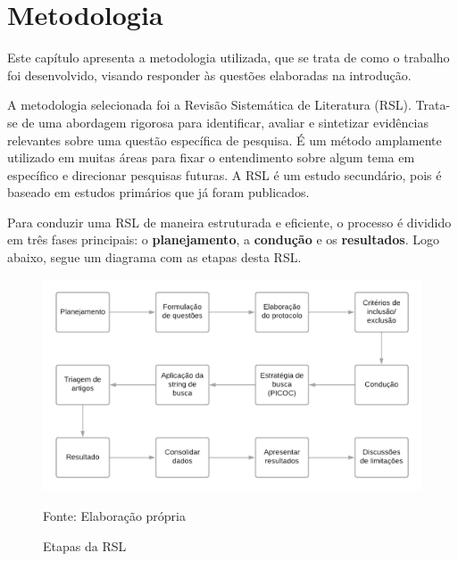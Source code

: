 \chapter[Metodologia]{Metodologia}

Este capítulo apresenta a metodologia utilizada, que se trata de como o trabalho foi desenvolvido, visando responder às questões elaboradas na introdução.

A metodologia selecionada foi a Revisão Sistemática de Literatura (RSL). Trata-se de uma abordagem rigorosa para identificar, avaliar e sintetizar evidências relevantes sobre uma questão específica de pesquisa. É um método amplamente utilizado em muitas áreas para fixar o entendimento sobre algum tema em específico e direcionar pesquisas futuras. A RSL é um estudo secundário, pois é baseado em estudos primários que já foram publicados.

Para conduzir uma RSL de maneira estruturada e eficiente, o processo é dividido em três fases principais: o \textbf{planejamento}, a \textbf{condução} e os \textbf{resultados}. Logo abaixo, segue um diagrama com as etapas desta RSL.

\begin{figure}[h]
	\centering %
	\includegraphics[width=16cm]{figuras/diagrama-RSL.png} %
	\caption{Etapas da RSL}
	Fonte: Elaboração própria
	\label{figura:diagrama rsl}
\end{figure}

